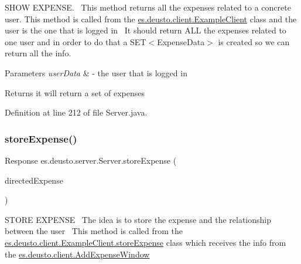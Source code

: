 S\+H\+OW E\+X\+P\+E\+N\+SE.~\newline
 This method returns all the expenses related to a concrete user. This method is called from the \hyperlink{classes_1_1deusto_1_1client_1_1_example_client}{es.\+deusto.\+client.\+Example\+Client} class and the user is the one that is logged in~\newline
 It should return A\+LL the expenses related to one user and in order to do that a S\+E\+T$<$\+Expense\+Data$>$ is created so we can return all the info.


\begin{DoxyParams}{Parameters}
{\em user\+Data} & -\/ the user that is logged in \\
\hline
\end{DoxyParams}
\begin{DoxyReturn}{Returns}
it will return a set of expenses 
\end{DoxyReturn}


Definition at line 212 of file Server.\+java.

\mbox{\label{classes_1_1deusto_1_1server_1_1_server_a1a91c5bde8d3b39fc4292dc09d62b61b}} 
\subsubsection{\texorpdfstring{store\+Expense()}{storeExpense()}}
{\footnotesize\ttfamily Response es.\+deusto.\+server.\+Server.\+store\+Expense (\begin{DoxyParamCaption}\item[{\hyperlink{classes_1_1deusto_1_1serialization_1_1_directed_message}{Directed\+Message}}]{directed\+Expense }\end{DoxyParamCaption})}

S\+T\+O\+RE E\+X\+P\+E\+N\+SE~\newline
The idea is to store the expense and the relationship between the user~\newline
 This method is called from the \hyperlink{classes_1_1deusto_1_1client_1_1_example_client_aba5fe3dfb882ef22d0bd49b5915871d3}{es.\+deusto.\+client.\+Example\+Client.\+store\+Expense} class which receives the info from the \hyperlink{classes_1_1deusto_1_1client_1_1_add_expense_window}{es.\+deusto.\+client.\+Add\+Expense\+Window}~\newline

